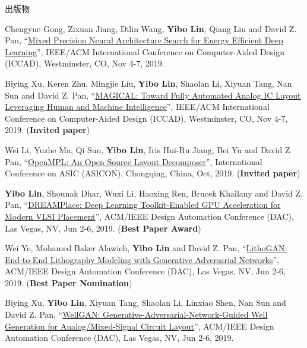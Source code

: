 \begin{rSection}{出版物}
\begin{description}[font=\normalfont]
{}
            

\item[{[C31]}]{
        Chengyue Gong, Zixuan Jiang, Dilin Wang, \textbf{Yibo Lin}, Qiang Liu and David Z. Pan, 
    ``\href{https://doi.org/10.1109/ICCAD45719.2019.8942147}{Mixed Precision Neural Architecture Search for Energy Efficient Deep Learning}'', 
    IEEE/ACM International Conference on Computer-Aided Design (ICCAD), Westminster, CO, Nov 4-7, 2019.
    
}
            

\item[{[C30]}]{
        Biying Xu, Keren Zhu, Mingjie Liu, \textbf{Yibo Lin}, Shaolan Li, Xiyuan Tang, Nan Sun and David Z. Pan, 
    ``\href{https://doi.org/10.1109/ICCAD45719.2019.8942060}{MAGICAL: Toward Fully Automated Analog IC Layout Leveraging Human and Machine Intelligence}'', 
    IEEE/ACM International Conference on Computer-Aided Design (ICCAD), Westminster, CO, Nov 4-7, 2019.
    (\textbf{Invited paper})
}
            

\item[{[C29]}]{
        Wei Li, Yuzhe Ma, Qi Sun, \textbf{Yibo Lin}, Iris Hui-Ru Jiang, Bei Yu and David Z Pan, 
    ``\href{https://arxiv.org/abs/1809.07554}{OpenMPL: An Open Source Layout Decomposer}'', 
    International Conference on ASIC (ASICON), Chongqing, China, Oct, 2019.
    (\textbf{Invited paper})
}
            

\item[{[C28]}]{
        \textbf{Yibo Lin}, Shounak Dhar, Wuxi Li, Haoxing Ren, Brucek Khailany and David Z. Pan, 
    ``\href{https://doi.org/10.1145/3316781.3317803}{DREAMPlace: Deep Learning Toolkit-Enabled GPU Acceleration for Modern VLSI Placement}'', 
    ACM/IEEE Design Automation Conference (DAC), Las Vegas, NV, Jun 2-6, 2019.
    (\textbf{Best Paper Award})
}
            

\item[{[C27]}]{
        Wei Ye, Mohamed Baker Alawieh, \textbf{Yibo Lin} and David Z. Pan, 
    ``\href{https://doi.org/10.1145/3316781.3317852}{LithoGAN: End-to-End Lithography Modeling with Generative Adversarial Networks}'', 
    ACM/IEEE Design Automation Conference (DAC), Las Vegas, NV, Jun 2-6, 2019.
    (\textbf{Best Paper Nomination})
}
            

\item[{[C26]}]{
        Biying Xu, \textbf{Yibo Lin}, Xiyuan Tang, Shaolan Li, Linxiao Shen, Nan Sun and David Z. Pan, 
    ``\href{https://doi.org/10.1145/3316781.3317930}{WellGAN: Generative-Adversarial-Network-Guided Well Generation for Analog/Mixed-Signal Circuit Layout}'', 
    ACM/IEEE Design Automation Conference (DAC), Las Vegas, NV, Jun 2-6, 2019.
    
}
\end{description}
\end{rSection}
